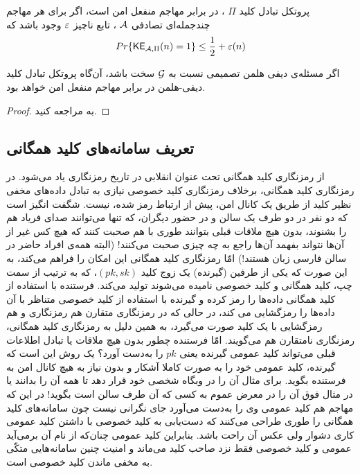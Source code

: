 \begin{definition}
پروتکل تبادل کلید 
$\Pi$
، در برابر مهاجم منفعل امن است، اگر برای هر مهاجم چندجمله‌ای تصادفی 
$\mathcal{A}$
، تابع ناچیز
$\varepsilon$
وجود باشد که
$$Pr\{\mathsf{KE}_{\mathcal{A},\Pi}(n) = 1\}\leq \frac{1}{2} + \varepsilon(n)$$
\end{definition}

\begin{theorem}
اگر مسئله‌ی دیفی هلمن تصمیمی نسبت به 
${\mathcal G}$	
سخت باشد، آن‌گاه پروتکل تبادل کلید دیفی-هلمن در برابر مهاجم منفعل امن خواهد بود.
\begin{proof}
به 
\cite{katz2014introduction}
مراجعه کنید.
\end{proof}
\end{theorem}

\subsection*{تعریف سامانه‌های کلید همگانی}

از رمزنگاری کلید همگانی تحت عنوان انقلابی در تاریخ رمزنگاری یاد می‌شود. در رمزنگاری کلید همگانی، برخلاف رمزنگاری کلید خصوصی نیازی به تبادل داده‌های مخفی نظیر کلید از طریق یک کانال امن، پیش از ارتباط رمز شده، نیست. شگفت انگیز است که دو نفر در دو طرف یک سالن و در حضور دیگران، که تنها می‌توانند صدای فریاد هم را بشنوند، بدون هیچ ملاقات قبلی بتوانند طوری با هم صحبت کنند که هیچ کس غیر از آن‌ها نتواند بفهمد آن‌ها راجع به چه چیزی صحبت می‌کنند! (البته همه‌ی افراد حاضر در سالن فارسی زبان هستند!) امّا رمزنگاری کلید همگانی این امکان را فراهم می‌کند، به این صورت که یکی از طرفین (گیرنده) یک زوج کلید 
$(pk, sk)$، 
 که به ترتیب از سمت چپ، کلید همگانی و کلید خصوصی نامیده می‌شوند تولید می‌کند. فرستنده با استفاده از کلید همگانی داده‌ها را رمز کرده و گیرنده با استفاده از کلید خصوصی متناظر با آن داده‌ها را رمزگشایی می کند، در حالی که در رمزنگاری متقارن هم رمزنگاری و هم رمزگشایی با یک کلید صورت می‌گیرد، به همین دلیل به رمزنگاری کلید همگانی، رمزنگاری نامتقارن هم می‌گویند. امّا فرستنده چطور بدون هیچ ملاقات یا تبادل اطلاعات قبلی می‌تواند کلید عمومی گیرنده یعنی 
$pk$
را به‌دست  آورد؟ یک روش این است که گیرنده، کلید عمومی خود را به صورت کاملا آشکار و بدون نیاز به هیچ کانال امن به فرستنده بگوید. برای مثال آن را در وبگاه شخصی خود قرار دهد تا همه آن را بدانند یا در مثال فوق آن را در معرض عموم به کسی که آن طرف سالن است بگوید! در این که مهاجم هم کلید عمومی وی را به‌دست  می‌آورد جای نگرانی نیست چون سامانه‌های کلید همگانی را طوری طراحی می‌کنند که دست‌یابی به کلید خصوصی با داشتن کلید عمومی کاری دشوار ولی عکس آن راحت باشد. بنابراین کلید عمومی چنان‌که از نام آن برمی‌آید عمومی و کلید خصوصی فقط نزد صاحب کلید می‌ماند و امنیت چنین سامانه‌هایی متکّی به مخفی ماندن کلید خصوصی است.


